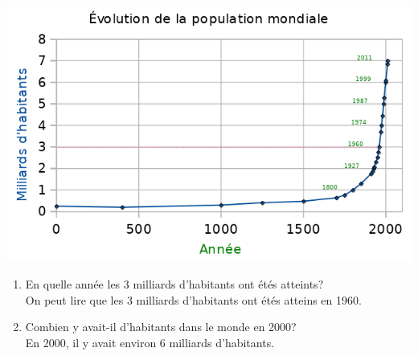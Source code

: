 \documentclass[12pt,a4paper]{article}
\begin{document}
\includegraphics[scale=1]{img/graph-cart.png} 

\begin{enumerate}[label=\textbf{\alph*.}]
\item En quelle année les 3 milliards d'habitants ont étés atteints?\\
On peut lire que les 3 milliards d'habitants ont étés atteins en 1960.
\item Combien y avait-il d'habitants dans le monde en 2000?\\
En 2000, il y avait environ 6 milliards d'habitants.
\end{enumerate}
\end{document}
